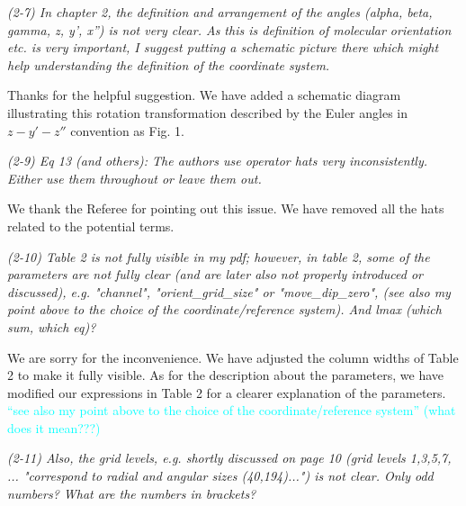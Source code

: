 \documentclass[a4paper,11pt]{article}
\newcommand{\cyan}[1]{\textcolor{cyan}{#1}}
\begin{document}

\textit{
(2-7)
In chapter 2, the definition and arrangement of the angles (alpha, beta, gamma, z, y', x'') is not very clear. As this is definition of molecular orientation etc. is very important, I suggest putting a schematic picture there which might help understanding the definition of the coordinate system.
}

\vspace{1em}

Thanks for the helpful suggestion.
We have added a schematic diagram illustrating this rotation transformation described by the Euler angles in $z-y'-z''$ convention as Fig. 1.

\vspace{2em}


\textit{
(2-9)
Eq 13 (and others): The authors use operator hats very inconsistently. Either use them throughout or leave them out.
}

\vspace{1em}

We thank the Referee for pointing out this issue.
We have removed all the hats related to the potential terms.

\vspace{2em}


\textit{
(2-10)
Table 2 is not fully visible in my pdf; however, in table 2, some of the parameters are not fully clear (and are later also not properly introduced or discussed), e.g. "channel", "orient\_grid\_size" or "move\_dip\_zero", (see also my point above to the choice of the coordinate/reference system). And lmax (which sum, which eq)?
}

\vspace{1em}

We are sorry for the inconvenience. We have adjusted the column widths of Table 2 to make it fully visible.
As for the description about the parameters, we have modified our expressions in Table 2 for a clearer explanation of the parameters.
\cyan{``see also my point above to the choice of the coordinate/reference system'' (what does it mean???)}

\vspace{2em}


\textit{
(2-11)
Also, the grid levels, e.g. shortly discussed on page 10 (grid levels 1,3,5,7, ... "correspond to radial and angular sizes (40,194)...") is not clear. Only odd numbers? What are the numbers in brackets?
}
\end{document}
